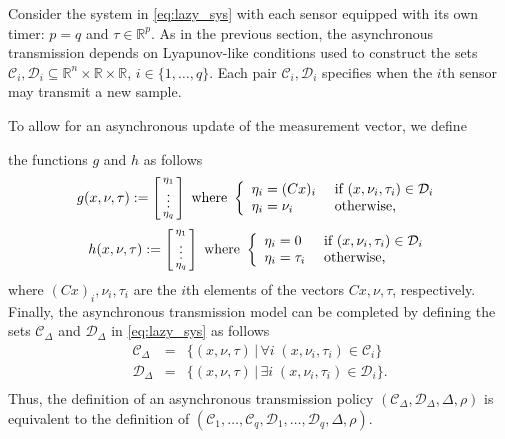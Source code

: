 \documentclass[twocolumn]{autart}
\newcommand{\realn}{\real^n}
\newcommand\real{\ensuremath{{\mathbb R}}}
\newcommand{\smallmat}[1]{\left[ \begin{smallmatrix}#1
    \end{smallmatrix} \right]}
\begin{document}
{
Consider the system in \eqref{eq:lazy_sys} with each
sensor equipped with its own timer: $p=q$ and $\tau\in\real^p$. 
As in the previous section, the asynchronous transmission depends on
Lyapunov-like conditions used to construct the sets 
$\mathcal{C}_i,\mathcal{D}_i \subseteq \realn\times\real\times\real$, $i\in\{1,\dots,q\}$.
Each pair $\mathcal{C}_i,\mathcal{D}_i$
specifies when the $i$th sensor may transmit
a new sample. 

To allow for an asynchronous update of the measurement vector, we define}
the functions $g$ and $h$  as follows
\begin{equation}
\label{eq:g_async}
g(x,\nu,\tau):=
\smallmat{\eta_1 \\ \vdots \\ \eta_q}
\mbox{ where } \\
\left\{\begin{array}{ll}
 \eta_i = (Cx)_i & \mbox{ if }(x,\nu_i,\tau_i)\in {\mathcal{D}}_i \\
 \eta_i = \nu_i & \mbox{ otherwise,}
\end{array} \right.
\end{equation}
\begin{equation}
\label{eq:h_async}
h(x,\nu,\tau):=
\smallmat{\eta_1 \\ \vdots \\ \eta_q}
\mbox{ where } \\
\left\{\begin{array}{ll}
 \eta_i = 0 & \mbox{ if }(x,\nu_i,\tau_i)\in {\mathcal{D}}_i \\
 \eta_i = \tau_i & \mbox{ otherwise,}
\end{array} \right.
\end{equation}
where $(Cx)_i,\nu_i,\tau_i$ are the $i$th elements of the vectors $Cx,\nu,\tau$, 
respectively. 
Finally, the asynchronous transmission model can be completed 
 by defining the sets $\mathcal{C}_\Delta$ and $\mathcal{D}_\Delta$ 
in \eqref{eq:lazy_sys} as follows
\begin{equation}
\label{CD_fullstate3}
\begin{array}{lll}
 {\mathcal{C}_\Delta} &=& \{(x,\nu,\tau)\,|\, 
\forall i\; (x,\nu_i,\tau_i)\in {\mathcal{C}}_i \} \\
 {\mathcal{D}_\Delta} &=& \{(x,\nu,\tau)\,|\, 
\exists i\; 
 (x,\nu_i,\tau_i)\in {\mathcal{D}}_i \}. \\
\end{array}
\end{equation}
Thus, the definition of an asynchronous transmission policy 
$(\mathcal{C}_\Delta,\mathcal{D}_\Delta,\Delta,\rho)$ is equivalent to the definition of
$(\mathcal{C}_1,\dots,\mathcal{C}_q,\mathcal{D}_1,\dots,\mathcal{D}_q,\Delta,\rho)$.
\end{document}
